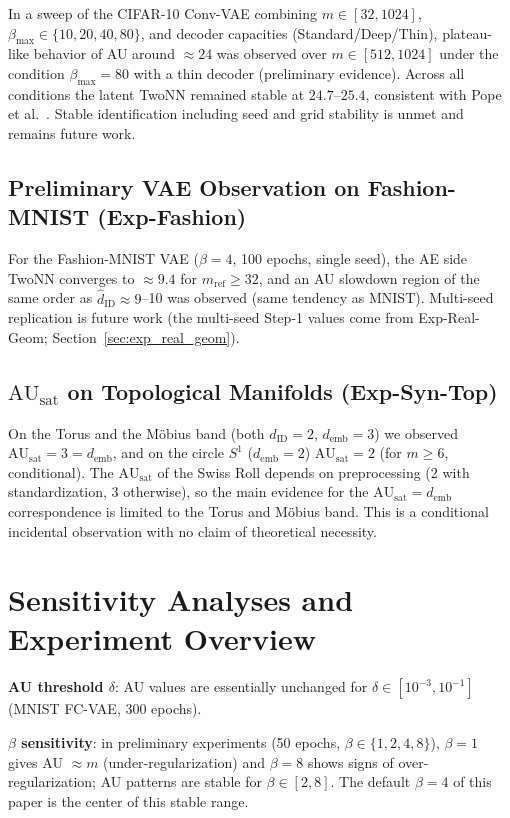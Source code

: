\documentclass[make,article,submit,pdftex,moreauthors]{Definitions/mdpi}
\newcommand{\dID}{d_{\mathrm{ID}}}
\newcommand{\hatdID}{\hat{d}_{\mathrm{ID}}}
\newcommand{\AUsat}{\mathrm{AU}_{\mathrm{sat}}}
\newcommand{\demb}{d_{\mathrm{emb}}}
\begin{document}
In a sweep of the CIFAR-10 Conv-VAE combining $m \in [32, 1024]$,
$\beta_{\max} \in \{10, 20, 40, 80\}$, and decoder capacities
(Standard/Deep/Thin), plateau-like behavior of AU around $\approx 24$ was
observed over $m \in [512, 1024]$ under the condition
$\beta_{\max} = 80$ with a thin decoder (preliminary evidence).
Across all conditions the latent TwoNN remained stable at $24.7$--$25.4$,
consistent with Pope et al.~\cite{pope2021intrinsic}.
Stable identification including seed and grid stability is unmet and remains
future work.

\subsection[\appendixname~\thesubsection]{Preliminary VAE Observation on Fashion-MNIST (Exp-Fashion)}

For the Fashion-MNIST VAE ($\beta = 4$, 100 epochs, single seed), the AE
side TwoNN converges to $\approx 9.4$ for $m_{\mathrm{ref}} \geq 32$, and an
AU slowdown region of the same order as $\hatdID \approx 9$--10 was
observed (same tendency as MNIST).
Multi-seed replication is future work (the multi-seed Step-1 values come
from Exp-Real-Geom; Section~\ref{sec:exp_real_geom}).

\subsection[\appendixname~\thesubsection]{$\AUsat$ on Topological Manifolds (Exp-Syn-Top)}

On the Torus and the M\"obius band (both $\dID = 2$, $\demb = 3$) we
observed $\AUsat = 3 = \demb$, and on the circle $S^1$ ($\demb = 2$)
$\AUsat = 2$ (for $m \geq 6$, conditional).
The $\AUsat$ of the Swiss Roll depends on preprocessing (2 with
standardization, 3 otherwise), so the main evidence for the
$\AUsat = \demb$ correspondence is limited to the Torus and M\"obius band.
This is a conditional incidental observation with no claim of theoretical
necessity.

\section[\appendixname~\thesection]{Sensitivity Analyses and Experiment Overview}\label{app:sens}

\textbf{AU threshold $\delta$}: AU values are essentially unchanged for
$\delta \in [10^{-3}, 10^{-1}]$ (MNIST FC-VAE, 300 epochs).

\textbf{$\beta$ sensitivity}: in preliminary experiments (50 epochs,
$\beta \in \{1, 2, 4, 8\}$), $\beta = 1$ gives AU $\approx m$
(under-regularization) and $\beta = 8$ shows signs of over-regularization;
AU patterns are stable for $\beta \in [2, 8]$.
The default $\beta = 4$ of this paper is the center of this stable range.
\end{document}
